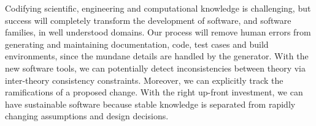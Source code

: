 \documentclass[sigconf,review,anonymous=false]{acmart}
\begin{document}
Codifying scientific, engineering and computational knowledge is challenging,
but success will completely transform the development of software, and software
families, in well understood domains. Our process will remove human errors from
generating and maintaining documentation, code, test cases and build
environments, since the mundane details are handled by the generator.  With the
new software tools, we can potentially detect inconsistencies between theory via
inter-theory consistency constraints. Moreover, we can explicitly track the
ramifications of a proposed change.  With the right up-front investment, we can
have sustainable software because stable knowledge is separated from rapidly
changing assumptions and design decisions.



\end{document}
